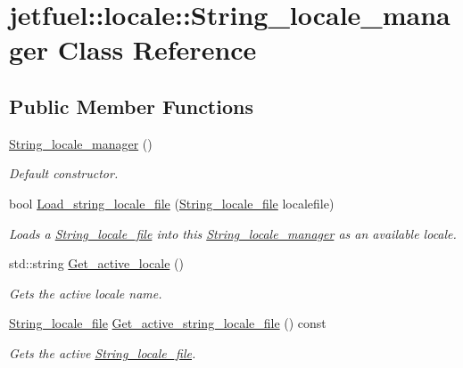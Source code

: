 \hypertarget{classjetfuel_1_1locale_1_1String__locale__manager}{}\section{jetfuel\+:\+:locale\+:\+:String\+\_\+locale\+\_\+manager Class Reference}
\label{classjetfuel_1_1locale_1_1String__locale__manager}
\subsection*{Public Member Functions}
\begin{DoxyCompactItemize}
\item 
\hyperlink{classjetfuel_1_1locale_1_1String__locale__manager_a347f49d477102a965dcbf288a79b403a}{String\+\_\+locale\+\_\+manager} ()
\begin{DoxyCompactList}\small\item\em Default constructor. \end{DoxyCompactList}\item 
bool \hyperlink{classjetfuel_1_1locale_1_1String__locale__manager_a2a972352f2b52a6aec947aad636ca6f1}{Load\+\_\+string\+\_\+locale\+\_\+file} (\hyperlink{classjetfuel_1_1locale_1_1String__locale__file}{String\+\_\+locale\+\_\+file} localefile)
\begin{DoxyCompactList}\small\item\em Loads a \hyperlink{classjetfuel_1_1locale_1_1String__locale__file}{String\+\_\+locale\+\_\+file} into this \hyperlink{classjetfuel_1_1locale_1_1String__locale__manager}{String\+\_\+locale\+\_\+manager} as an available locale. \end{DoxyCompactList}\item 
std\+::string \hyperlink{classjetfuel_1_1locale_1_1String__locale__manager_a41b25b50b804bce31184b32e6dc97fae}{Get\+\_\+active\+\_\+locale} ()
\begin{DoxyCompactList}\small\item\em Gets the active locale name. \end{DoxyCompactList}\item 
\hyperlink{classjetfuel_1_1locale_1_1String__locale__file}{String\+\_\+locale\+\_\+file} \hyperlink{classjetfuel_1_1locale_1_1String__locale__manager_af1984ab8c95bbfdf8211185a70b5ea4a}{Get\+\_\+active\+\_\+string\+\_\+locale\+\_\+file} () const
\begin{DoxyCompactList}\small\item\em Gets the active \hyperlink{classjetfuel_1_1locale_1_1String__locale__file}{String\+\_\+locale\+\_\+file}. \end{DoxyCompactList}\item 

\end{DoxyCompactItemize}
